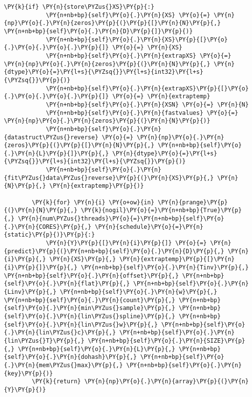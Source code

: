 \begin{Verbatim}[commandchars=\\\{\}]
        \PY{k}{if} \PY{n}{store\PYZus{}XS}\PY{p}{:}
            \PY{n+nb+bp}{self}\PY{o}{.}\PY{n}{XS} \PY{o}{=} \PY{n}{np}\PY{o}{.}\PY{n}{zeros}\PY{p}{(}\PY{p}{[}\PY{n}{N}\PY{p}{,} \PY{n+nb+bp}{self}\PY{o}{.}\PY{n}{D}\PY{p}{]}\PY{p}{)}
            \PY{n+nb+bp}{self}\PY{o}{.}\PY{n}{XS}\PY{p}{[}\PY{o}{.}\PY{o}{.}\PY{o}{.}\PY{p}{]} \PY{o}{=} \PY{n}{XS}
            \PY{n+nb+bp}{self}\PY{o}{.}\PY{n}{extrapXS} \PY{o}{=} \PY{n}{np}\PY{o}{.}\PY{n}{zeros}\PY{p}{(}\PY{n}{N}\PY{p}{,} \PY{n}{dtype}\PY{o}{=}\PY{l+s}{\PYZsq{}}\PY{l+s}{int32}\PY{l+s}{\PYZsq{}}\PY{p}{)}
            \PY{n+nb+bp}{self}\PY{o}{.}\PY{n}{extrapXS}\PY{p}{[}\PY{o}{.}\PY{o}{.}\PY{o}{.}\PY{p}{]} \PY{o}{=} \PY{n}{extraptemp}
            \PY{n+nb+bp}{self}\PY{o}{.}\PY{n}{XSN} \PY{o}{=} \PY{n}{N}
            \PY{n+nb+bp}{self}\PY{o}{.}\PY{n}{fastvalues} \PY{o}{=} \PY{n}{np}\PY{o}{.}\PY{n}{zeros}\PY{p}{(}\PY{n}{N}\PY{p}{)}
            \PY{n+nb+bp}{self}\PY{o}{.}\PY{n}{datastruct\PYZus{}reverse} \PY{o}{=} \PY{n}{np}\PY{o}{.}\PY{n}{zeros}\PY{p}{(}\PY{p}{[}\PY{n}{N}\PY{p}{,} \PY{n+nb+bp}{self}\PY{o}{.}\PY{n}{L}\PY{p}{]}\PY{p}{,} \PY{n}{dtype}\PY{o}{=}\PY{l+s}{\PYZsq{}}\PY{l+s}{int32}\PY{l+s}{\PYZsq{}}\PY{p}{)}
            \PY{n+nb+bp}{self}\PY{o}{.}\PY{n}{fit\PYZus{}data\PYZus{}reverse}\PY{p}{(}\PY{n}{XS}\PY{p}{,} \PY{n}{N}\PY{p}{,} \PY{n}{extraptemp}\PY{p}{)}

        \PY{k}{for} \PY{n}{i} \PY{o+ow}{in} \PY{n}{prange}\PY{p}{(}\PY{n}{N}\PY{p}{,} \PY{k}{nogil}\PY{o}{=}\PY{n+nb+bp}{True}\PY{p}{,} \PY{n}{num\PYZus{}threads}\PY{o}{=}\PY{n+nb+bp}{self}\PY{o}{.}\PY{n}{CORES}\PY{p}{,} \PY{n}{schedule}\PY{o}{=}\PY{n}{static}\PY{p}{)}\PY{p}{:}
            \PY{n}{Y}\PY{p}{[}\PY{n}{i}\PY{p}{]} \PY{o}{=} \PY{n}{predict}\PY{p}{(}\PY{n+nb+bp}{self}\PY{o}{.}\PY{n}{D}\PY{p}{,} \PY{n}{i}\PY{p}{,} \PY{n}{XS}\PY{p}{,} \PY{n}{extraptemp}\PY{p}{[}\PY{n}{i}\PY{p}{]}\PY{p}{,} \PY{n+nb+bp}{self}\PY{o}{.}\PY{n}{Tinv}\PY{p}{,} \PY{n+nb+bp}{self}\PY{o}{.}\PY{n}{offset}\PY{p}{,} \PY{n+nb+bp}{self}\PY{o}{.}\PY{n}{flat}\PY{p}{,} \PY{n+nb+bp}{self}\PY{o}{.}\PY{n}{Linv}\PY{p}{,} \PY{n+nb+bp}{self}\PY{o}{.}\PY{n}{w}\PY{p}{,} \PY{n+nb+bp}{self}\PY{o}{.}\PY{n}{count}\PY{p}{,} \PY{n+nb+bp}{self}\PY{o}{.}\PY{n}{min\PYZus{}sample}\PY{p}{,} \PY{n+nb+bp}{self}\PY{o}{.}\PY{n}{lin\PYZus{}spline}\PY{p}{,} \PY{n+nb+bp}{self}\PY{o}{.}\PY{n}{lin\PYZus{}w}\PY{p}{,} \PY{n+nb+bp}{self}\PY{o}{.}\PY{n}{lin\PYZus{}c}\PY{p}{,} \PY{n+nb+bp}{self}\PY{o}{.}\PY{n}{lin\PYZus{}T}\PY{p}{,} \PY{n+nb+bp}{self}\PY{o}{.}\PY{n}{SIZE}\PY{p}{,} \PY{n+nb+bp}{self}\PY{o}{.}\PY{n}{L}\PY{p}{,} \PY{n+nb+bp}{self}\PY{o}{.}\PY{n}{dohash}\PY{p}{,} \PY{n+nb+bp}{self}\PY{o}{.}\PY{n}{mem\PYZus{}max}\PY{p}{,} \PY{n+nb+bp}{self}\PY{o}{.}\PY{n}{key}\PY{p}{)}
        \PY{k}{return} \PY{n}{np}\PY{o}{.}\PY{n}{array}\PY{p}{(}\PY{n}{Y}\PY{p}{)}
    

\end{Verbatim}
